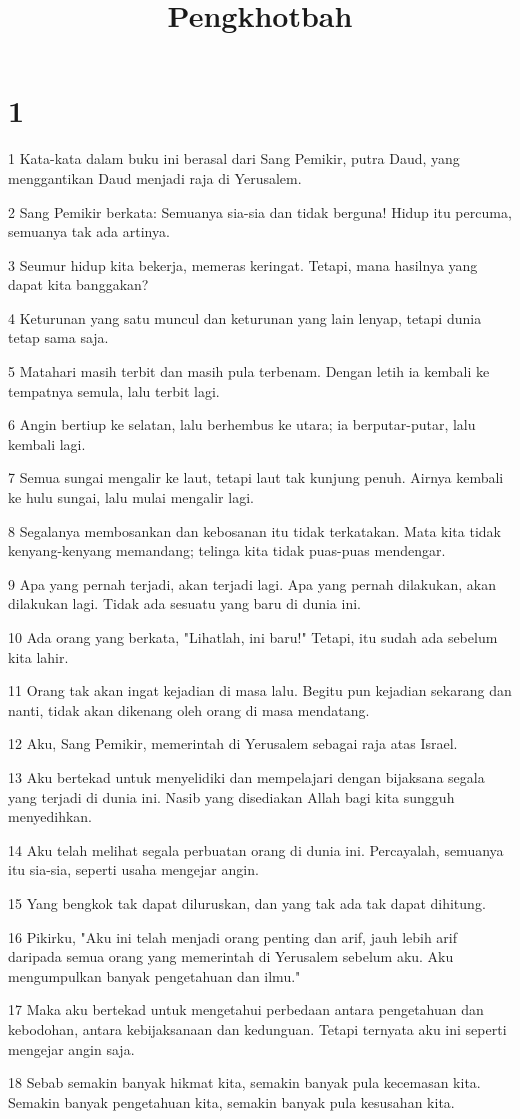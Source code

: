 

\title{Pengkhotbah}


\chapter{1}

\par 1 Kata-kata dalam buku ini berasal dari Sang Pemikir, putra Daud, yang menggantikan Daud menjadi raja di Yerusalem.
\par 2 Sang Pemikir berkata: Semuanya sia-sia dan tidak berguna! Hidup itu percuma, semuanya tak ada artinya.
\par 3 Seumur hidup kita bekerja, memeras keringat. Tetapi, mana hasilnya yang dapat kita banggakan?
\par 4 Keturunan yang satu muncul dan keturunan yang lain lenyap, tetapi dunia tetap sama saja.
\par 5 Matahari masih terbit dan masih pula terbenam. Dengan letih ia kembali ke tempatnya semula, lalu terbit lagi.
\par 6 Angin bertiup ke selatan, lalu berhembus ke utara; ia berputar-putar, lalu kembali lagi.
\par 7 Semua sungai mengalir ke laut, tetapi laut tak kunjung penuh. Airnya kembali ke hulu sungai, lalu mulai mengalir lagi.
\par 8 Segalanya membosankan dan kebosanan itu tidak terkatakan. Mata kita tidak kenyang-kenyang memandang; telinga kita tidak puas-puas mendengar.
\par 9 Apa yang pernah terjadi, akan terjadi lagi. Apa yang pernah dilakukan, akan dilakukan lagi. Tidak ada sesuatu yang baru di dunia ini.
\par 10 Ada orang yang berkata, "Lihatlah, ini baru!" Tetapi, itu sudah ada sebelum kita lahir.
\par 11 Orang tak akan ingat kejadian di masa lalu. Begitu pun kejadian sekarang dan nanti, tidak akan dikenang oleh orang di masa mendatang.
\par 12 Aku, Sang Pemikir, memerintah di Yerusalem sebagai raja atas Israel.
\par 13 Aku bertekad untuk menyelidiki dan mempelajari dengan bijaksana segala yang terjadi di dunia ini. Nasib yang disediakan Allah bagi kita sungguh menyedihkan.
\par 14 Aku telah melihat segala perbuatan orang di dunia ini. Percayalah, semuanya itu sia-sia, seperti usaha mengejar angin.
\par 15 Yang bengkok tak dapat diluruskan, dan yang tak ada tak dapat dihitung.
\par 16 Pikirku, "Aku ini telah menjadi orang penting dan arif, jauh lebih arif daripada semua orang yang memerintah di Yerusalem sebelum aku. Aku mengumpulkan banyak pengetahuan dan ilmu."
\par 17 Maka aku bertekad untuk mengetahui perbedaan antara pengetahuan dan kebodohan, antara kebijaksanaan dan kedunguan. Tetapi ternyata aku ini seperti mengejar angin saja.
\par 18 Sebab semakin banyak hikmat kita, semakin banyak pula kecemasan kita. Semakin banyak pengetahuan kita, semakin banyak pula kesusahan kita.

